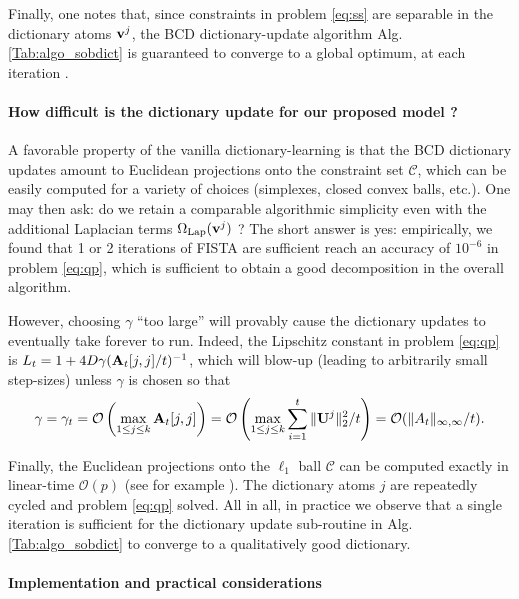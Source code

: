 Finally, one notes that, since constraints in problem \eqref{eq:ss} are separable in the dictionary atoms $\mathbf{v}^j$, the BCD dictionary-update algorithm Alg. \ref{Tab:algo_sobdict} is guaranteed to converge to a global optimum, at each iteration  \cite{bertsekas1999nonlinear, mairal2010}.

\paragraph*{How difficult is the dictionary update for our proposed model ?}
A favorable property of the vanilla dictionary-learning  \cite{mairal2010} is that the BCD dictionary updates amount to Euclidean projections onto the constraint set $\mathcal C$, which can be easily computed for a variety of choices (simplexes, closed convex balls, etc.). One may then ask: do we retain a comparable algorithmic simplicity even with the additional Laplacian terms $\Omega_{\text{Lap}}(\mathbf{v}^j)$ ? The short answer is yes:
empirically, we found that 1 or 2 iterations of FISTA \cite{beck09fista}
are sufficient reach an accuracy of $10^{-6}$ in problem \eqref{eq:qp}, which is sufficient to obtain a good decomposition in the overall algorithm.

However, choosing $\gamma$ ``too large'' will provably cause the dictionary updates to eventually take forever to run. Indeed, the Lipschitz constant in problem \eqref{eq:qp} is $L_t = 1 + 4D \gamma (\mathbf{A}_t[j,j]/t)^{-1}$, which will blow-up (leading to arbitrarily small step-sizes) unless $\gamma$ is chosen so that
\begin{equation}
\gamma = \gamma_t = \mathcal O\left(\max_{1 \le j \le k}\mathbf{A}_t[j,j]\right) = \mathcal O\left(\max_{1 \le j \le k}\sum_{i=1}^t\|\mathbf{U}^j\|_2^2/t\right) = \mathcal O(\|A_t\|_{\infty,\infty}/t).
\label{eq:blowup}
\end{equation}

Finally, the Euclidean projections onto the $\ell_1$ ball $\mathcal C$
can be computed exactly in linear-time $\mathcal O(p)$ (see for example
 \cite{condat2014fast,duchi2008efficient}).
The dictionary atoms $j$ are repeatedly cycled and problem \eqref{eq:qp} solved. %
All in all, in practice  we observe that a single iteration is sufficient
for the dictionary update sub-routine in Alg. \ref{Tab:algo_sobdict}
to converge to a qualitatively good dictionary.

\paragraph*{Implementation and practical considerations}

